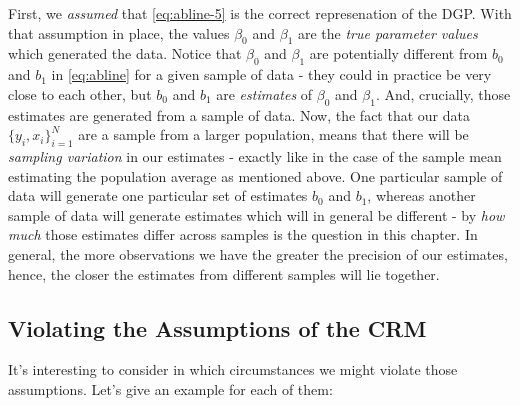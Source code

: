 \documentclass[]{book}
\begin{document}
First, we \emph{assumed} that \eqref{eq:abline-5} is the correct represenation of the DGP. With that assumption in place, the values \(\beta_0\) and \(\beta_1\) are the \emph{true parameter values} which generated the data. Notice that \(\beta_0\) and \(\beta_1\) are potentially different from \(b_0\) and \(b_1\) in \eqref{eq:abline} for a given sample of data - they could in practice be very close to each other, but \(b_0\) and \(b_1\) are \emph{estimates} of \(\beta_0\) and \(\beta_1\). And, crucially, those estimates are generated from a sample of data. Now, the fact that our data \(\{y_i,x_i\}_{i=1}^N\) are a sample from a larger population, means that there will be \emph{sampling variation} in our estimates - exactly like in the case of the sample mean estimating the population average as mentioned above. One particular sample of data will generate one particular set of estimates \(b_0\) and \(b_1\), whereas another sample of data will generate estimates which will in general be different - by \emph{how much} those estimates differ across samples is the question in this chapter. In general, the more observations we have the greater the precision of our estimates, hence, the closer the estimates from different samples will lie together.

\hypertarget{violating-the-assumptions-of-the-crm}{%
\subsection{Violating the Assumptions of the CRM}\label{violating-the-assumptions-of-the-crm}}

It's interesting to consider in which circumstances we might violate those assumptions. Let's give an example for each of them:
\end{document}

